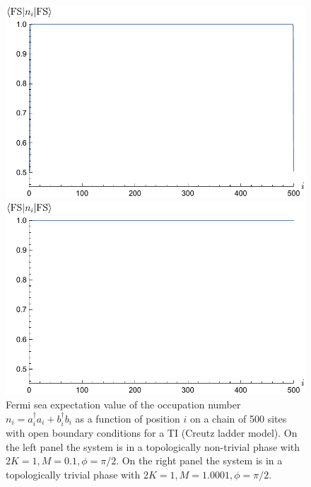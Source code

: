 \begin{figure}[h!]
\begin{minipage}{0.45\textwidth}
\centering
\includegraphics[scale=0.5]{fermisea_topological.pdf}
\end{minipage}
\begin{minipage}{0.45\textwidth}
\centering
\includegraphics[scale=0.5]{fermisea_trivial.pdf}
\end{minipage}
\caption{Fermi sea expectation value of the occupation number $n_i=a_i^\dagger a_i+b_i^{\dagger}b_i$ as a function of position $i$ on a chain of 500 sites with open boundary conditions for a TI (Creutz ladder model). On the left panel the system is in a topologically non-trivial phase with $2K=1,M=0.1,\phi=\pi/2$. On the right panel the system is in a topologically trivial phase with $2K=1,M=1.0001,\phi=\pi/2$.}
\label{fig:FS_occupation_number}
\end{figure}



